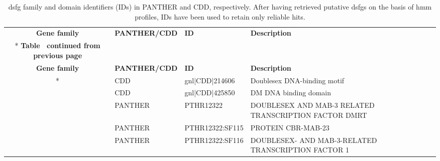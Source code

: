 \documentclass[../main.tex]{subfiles}
\begin{document}
\begin{landscape}
	\tiny
	\begin{longtable}{@{}cllll@{}}
		\caption{\gls{dsfg} family and domain identifiers (IDs) in PANTHER and CDD, respectively. After having retrieved putative \glspl{dsfg} on the basis of \gls{hmm} profiles, IDs have been used to retain only reliable hits.}
		\label{supp_tab:panther_cdd}                                                                                                                                                                                              \\
		\toprule
		\textbf{Gene family}            & \textbf{PANTHER/CDD} & \textbf{ID}     & \textbf{Description}                                                                                                                         & \\* \midrule \midrule
		\endfirsthead
		\multicolumn{5}{c}%
		{{\bfseries Table \thetable\ continued from previous page}}                                                                                                                                                               \\
		\toprule
		\textbf{Gene family}            & \textbf{PANTHER/CDD} & \textbf{ID}     & \textbf{Description}                                                                                                                         & \\* \midrule \midrule
		\endhead
		\multirow{11}{*}{\textbf{Dmrt}} & CDD                  & gnl|CDD|214606  & Doublesex DNA-binding motif                                                                                                                  & \\
		                                & CDD                  & gnl|CDD|425850  & DM DNA binding domain                                                                                                                        & \\
		                                & PANTHER              & PTHR12322       & DOUBLESEX AND MAB-3 RELATED TRANSCRIPTION FACTOR  DMRT                                                                                       & \\
		                                & PANTHER              & PTHR12322:SF115 & PROTEIN CBR-MAB-23                                                                                                                           & \\
		                                & PANTHER              & PTHR12322:SF116 & DOUBLESEX- AND MAB-3-RELATED TRANSCRIPTION FACTOR 1                                                                                          & \\

\end{longtable}
\end{landscape}
\end{document}

